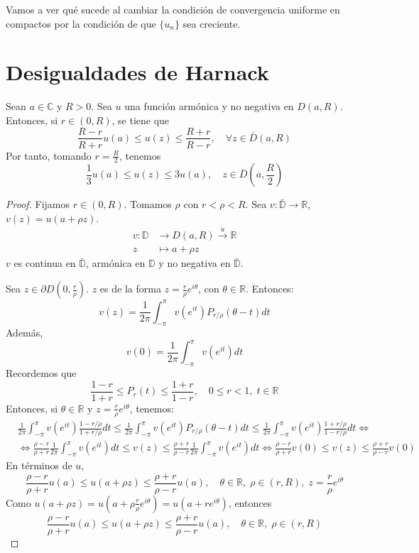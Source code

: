 Vamos a ver qué sucede al cambiar la condición de convergencia uniforme en compactos por la condición de que $\{u_n\}$ sea creciente.

\section{Desigualdades de Harnack}
Sean $a \in \mathbb{C}$ y $R > 0$.
Sea $u$ una función armónica y no negativa en $D(a, R)$.
Entonces, si $r \in (0, R)$, se tiene que
$$\frac{R-r}{R+r}u(a) \leq u(z) \leq \frac{R+r}{R-r}, \quad \forall z \in \bar{D}(a, R)$$
Por tanto, tomando $r = \frac{R}{2}$, tenemos
$$\frac{1}{3}u(a) \leq u(z) \leq 3u(a), \quad z \in \bar{D}\left(a, \frac{R}{2}\right)$$

\begin{proof}
    Fijamos $r \in (0, R)$.
    Tomamos $\rho$ con $r < \rho < R$.
    Sea $v: \bar{\mathbb{D}} \to \mathbb{R}$, $v(z) = u(a + \rho z)$.
    \begin{align*}
        v: \mathbb{D} & \to D(a, R) \xrightarrow{u} \mathbb{R} \\
        z             & \mapsto a + \rho z
    \end{align*}
    $v$ es continua en $\bar{\mathbb{D}}$, armónica en $\mathbb{D}$ y no negativa en $\bar{\mathbb{D}}$.

    Sea $z \in \partial D\left(0, \frac{r}{\rho}\right)$.
    $z$ es de la forma $z = \frac{r}{\rho}e^{i\theta}$, con $\theta \in \mathbb{R}$.
    Entonces:
    $$v(z) = \frac{1}{2\pi} \int_{-\pi}^\pi v(e^{it})P_{r/\rho}(\theta-t)dt$$
    Además,
    $$v(0) = \frac{1}{2\pi} \int_{-\pi}^\pi v(e^{it})dt$$
    Recordemos que
    $$\frac{1-r}{1+r} \leq P_r(t) \leq \frac{1+r}{1-r}, \quad 0 \leq r < 1, \; t \in \mathbb{R}$$
    Entonces, si $\theta \in \mathbb{R}$ y $z = \frac{r}{\rho}e^{i\theta}$, tenemos:
    \begin{align*}
         & \frac{1}{2\pi} \int_{-\pi}^\pi v(e^{it})\frac{1-r/\rho}{1+r/\rho}dt \leq \frac{1}{2\pi} \int_{-\pi}^\pi v(e^{it})P_{r/\rho}(\theta-t)dt \leq \frac{1}{2\pi} \int_{-\pi}^\pi v(e^{it})\frac{1+r/\rho}{1-r/\rho}dt \Leftrightarrow                    \\
         & \Leftrightarrow \frac{\rho-r}{\rho+r} \frac{1}{2\pi} \int_{-\pi}^\pi v(e^{it})dt \leq v(z) \leq \frac{\rho+r}{\rho-r} \frac{1}{2\pi} \int_{-\pi}^\pi v(e^{it})dt \Leftrightarrow \frac{\rho-r}{\rho+r}v(0) \leq v(z) \leq \frac{\rho+r}{\rho-r}v(0)
    \end{align*}
    En términos de $u$,
    $$\frac{\rho-r}{\rho+r}u(a) \leq u(a+\rho z) \leq \frac{\rho+r}{\rho-r}u(a), \quad \theta \in \mathbb{R}, \; \rho \in (r, R), \; z = \frac{r}{\rho}e^{i\theta}$$
    Como $u(a+\rho z) = u\left(a + \rho\frac{r}{\rho}e^{i\theta}\right) = u(a + re^{i\theta})$, entonces
    $$\frac{\rho-r}{\rho+r}u(a) \leq u(a+\rho z) \leq \frac{\rho+r}{\rho-r}u(a), \quad \theta \in \mathbb{R}, \; \rho \in (r, R)$$


\end{proof}

